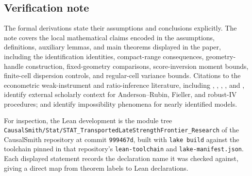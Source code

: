 \subsection{Verification note}

The formal derivations state their assumptions and conclusions explicitly. The note covers the local mathematical claims encoded in the assumptions, definitions, auxiliary lemmas, and main theorems displayed in the paper, including the identification identities, compact-range consequences, geometry-handle construction, fixed-geometry comparisons, score-inversion moment bounds, finite-cell dispersion controls, and regular-cell variance bounds. Citations to the econometric weak-instrument and ratio-inference literature, including \citet{AndersonRubin1949}, \citet{Fieller1954}, \citet{Moreira2003}, \citet{AndrewsMoreiraStock2006}, and \citet{Mikusheva2010}, identify external scholarly context for Anderson--Rubin, Fieller, and robust-IV procedures; \citet{GleserHwang1987} and \citet{Dufour1997} identify impossibility phenomena for nearly identified models.

For inspection, the Lean development is the module tree \texttt{CausalSmith/Stat/STAT\_TransportedLateStrengthFrontier\_Research} of the CausalSmith repository at commit \texttt{999467d}, built with \texttt{lake build} against the toolchain pinned in that repository's \texttt{lean-toolchain} and \texttt{lake-manifest.json}. Each displayed statement records the declaration name it was checked against, giving a direct map from theorem labels to Lean declarations.
